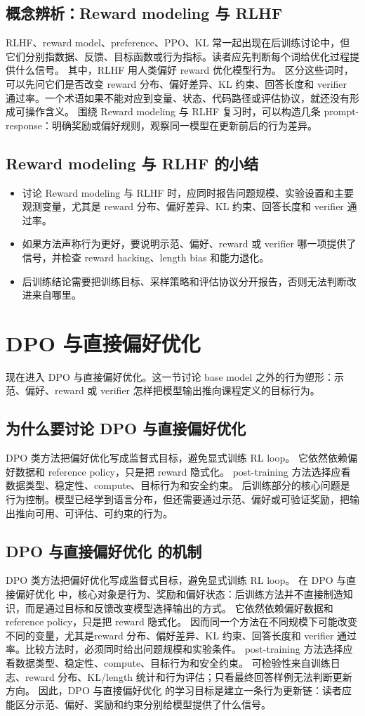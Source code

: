 \documentclass[a4paper]{article}
\begin{document}
\subsection{概念辨析：Reward modeling 与 RLHF}
RLHF、reward model、preference、PPO、KL 常一起出现在后训练讨论中，但它们分别指数据、反馈、目标函数或行为指标。读者应先判断每个词给优化过程提供什么信号。
其中，RLHF 用人类偏好 reward 优化模型行为。
区分这些词时，可以先问它们是否改变 reward 分布、偏好差异、KL 约束、回答长度和 verifier 通过率。一个术语如果不能对应到变量、状态、代码路径或评估协议，就还没有形成可操作含义。
围绕 Reward modeling 与 RLHF 复习时，可以构造几条 prompt-response：明确奖励或偏好规则，观察同一模型在更新前后的行为差异。
\subsection{Reward modeling 与 RLHF 的小结}
\begin{itemize}
\item 讨论 Reward modeling 与 RLHF 时，应同时报告问题规模、实验设置和主要观测变量，尤其是 reward 分布、偏好差异、KL 约束、回答长度和 verifier 通过率。
\item 如果方法声称行为更好，要说明示范、偏好、reward 或 verifier 哪一项提供了信号，并检查 reward hacking、length bias 和能力退化。
\item 后训练结论需要把训练目标、采样策略和评估协议分开报告，否则无法判断改进来自哪里。
\end{itemize}
\section{DPO 与直接偏好优化}
现在进入 DPO 与直接偏好优化。这一节讨论 base model 之外的行为塑形：示范、偏好、reward 或 verifier 怎样把模型输出推向课程定义的目标行为。
\subsection{为什么要讨论 DPO 与直接偏好优化}
DPO 类方法把偏好优化写成监督式目标，避免显式训练 RL loop。
它依然依赖偏好数据和 reference policy，只是把 reward 隐式化。
post-training 方法选择应看数据类型、稳定性、compute、目标行为和安全约束。
后训练部分的核心问题是行为控制。模型已经学到语言分布，但还需要通过示范、偏好或可验证奖励，把输出推向可用、可评估、可约束的行为。
\subsection{DPO 与直接偏好优化 的机制}
DPO 类方法把偏好优化写成监督式目标，避免显式训练 RL loop。 在 DPO 与直接偏好优化 中，核心对象是行为、奖励和偏好状态：后训练方法并不直接制造知识，而是通过目标和反馈改变模型选择输出的方式。
它依然依赖偏好数据和 reference policy，只是把 reward 隐式化。 因而同一个方法在不同规模下可能改变不同的变量，尤其是reward 分布、偏好差异、KL 约束、回答长度和 verifier 通过率。比较方法时，必须同时给出问题规模和实验条件。
post-training 方法选择应看数据类型、稳定性、compute、目标行为和安全约束。 可检验性来自训练日志、reward 分布、KL/length 统计和行为评估；只看最终回答样例无法判断更新方向。
因此，DPO 与直接偏好优化 的学习目标是建立一条行为更新链：读者应能区分示范、偏好、奖励和约束分别给模型提供了什么信号。
\end{document}
